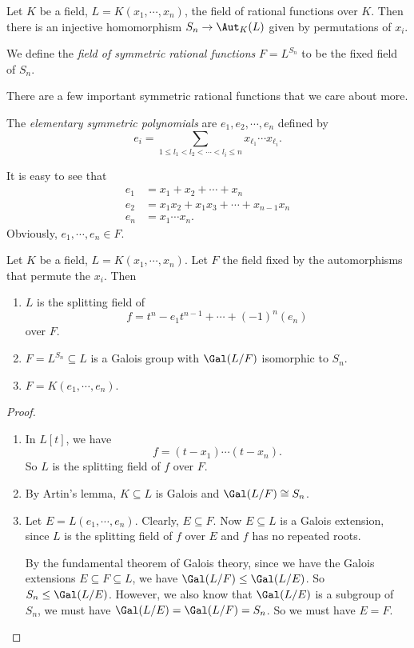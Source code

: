 \documentclass[a4paper]{article}
\begin{document}
\begin{defi}
  Let $K$ be a field, $L = K(x_1, \cdots, x_n)$, the field of rational functions over $K$. Then there is an injective homomorphism $S_n \to \Aut_K(L)$ given by permutations of $x_i$.

  We define the \emph{field of symmetric rational functions} $F = L^{S_n}$ to be the fixed field of $S_n$.
\end{defi}

There are a few important symmetric rational functions that we care about more.
\begin{defi}
  The \emph{elementary symmetric polynomials} are $e_1, e_2, \cdots, e_n$ defined by
  \[
    e_i = \sum_{1 \leq l_1 < l_2 < \cdots < l_i \leq n} x_{\ell_1} \cdots x_{\ell_i}.
  \]
\end{defi}
It is easy to see that
\begin{align*}
  e_1 &= x_1 + x_2 + \cdots + x_n\\
  e_2 &= x_1x_2 + x_1x_3 + \cdots + x_{n - 1}x_n\\
  e_n &= x_1\cdots x_n.
\end{align*}
Obviously, $e_1, \cdots, e_n \in F$.

\begin{thm}
  Let $K$ be a field, $L = K(x_1, \cdots, x_n)$. Let $F$ the field fixed by the automorphisms that permute the $x_i$. Then
  \begin{enumerate}
    \item $L$ is the splitting field of
      \[
        f = t^n - e_1 t^{n - 1} + \cdots + (-1)^n (e_n)
      \]
      over $F$.
    \item $F = L^{S_n} \subseteq L$ is a Galois group with $\Gal(L/F)$ isomorphic to $S_n$.
    \item $F = K(e_1, \cdots, e_n)$.
  \end{enumerate}
\end{thm}

\begin{proof}\leavevmode
  \begin{enumerate}
    \item In $L[t]$, we have
      \[
        f = (t - x_1)\cdots (t - x_n).
      \]
      So $L$ is the splitting field of $f$ over $F$.
    \item By Artin's lemma, $K\subseteq L$ is Galois and $\Gal(L/F) \cong S_n$.
    \item Let $E = L(e_1, \cdots, e_n)$. Clearly, $E \subseteq F$. Now $E\subseteq L$ is a Galois extension, since $L$ is the splitting field of $f$ over $E$ and $f$ has no repeated roots.

      By the fundamental theorem of Galois theory, since we have the Galois extensions $E\subseteq F \subseteq L$, we have $\Gal(L/F) \leq \Gal(L/E)$. So $S_n \leq \Gal(L/E)$. However, we also know that $\Gal(L/E)$ is a subgroup of $S_n$, we must have $\Gal(L/E) = \Gal(L/F) = S_n$. So we must have $E = F$.
  \end{enumerate}
\end{proof}
\end{document}
